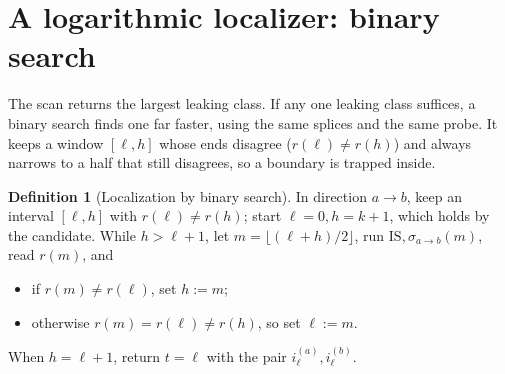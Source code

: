 \documentclass[11pt]{article}
\theoremstyle{definition}
\newtheorem{definition}{Definition}
\theoremstyle{plain}
\newcommand{\IS}{\mathrm{IS}}
\newcommand{\inp}[2]{i_{#1}^{(#2)}}
\begin{document}
\section{A logarithmic localizer: binary search}
\label{sec:bsearch}

The scan returns the largest leaking class. If any one leaking class suffices, a binary
search finds one far faster, using the same splices and the same probe. It keeps a
window $[\ell,h]$ whose ends disagree ($r(\ell)\neq r(h)$) and always narrows to a half
that still disagrees, so a boundary is trapped inside.

\begin{definition}[Localization by binary search]
\label{def:bsearch}
In direction $a\to b$, keep an interval $[\ell,h]$ with $r(\ell)\neq r(h)$; start
$\ell=0,h=k+1$, which holds by the candidate. While $h>\ell+1$, let
$m=\lfloor(\ell+h)/2\rfloor$, run $\IS,\sigma_{a\to b}(m)$, read $r(m)$, and
\begin{itemize}[nosep,leftmargin=*]
\item if $r(m)\neq r(\ell)$, set $h:=m$;
\item otherwise $r(m)=r(\ell)\neq r(h)$, so set $\ell:=m$.
\end{itemize}
When $h=\ell+1$, return $t=\ell$ with the pair $\inp{\ell}{a},\inp{\ell}{b}$.
\end{definition}

\begin{center}
\end{center}
\end{document}
